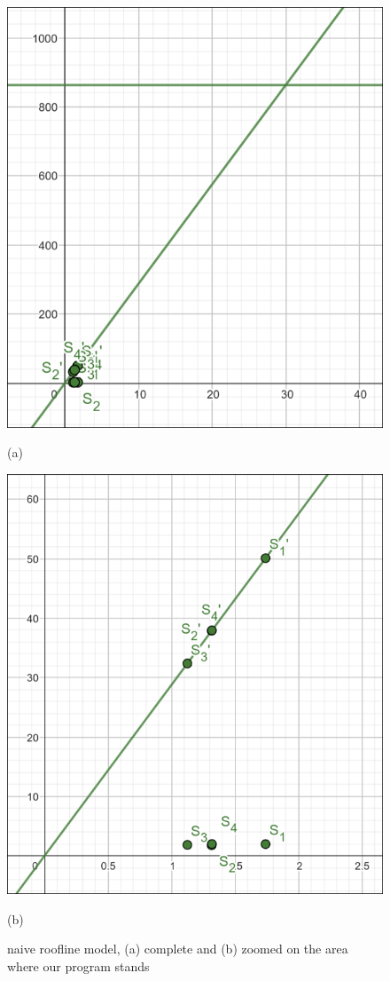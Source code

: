 \begin{figure}[h]
  \centering
  \includegraphics[width=\textwidth]{images/roofline-overview}
  \caption*{(a)}
  \endminipage\hfill
  \includegraphics[width=\textwidth]{images/roofline-zoom.png}
  \caption*{(b)}
  \endminipage\hfill
  \caption{\centering naive roofline model, (a) complete and (b) zoomed on the area where our program stands}\label{img:roofline-model}
\end{figure}

